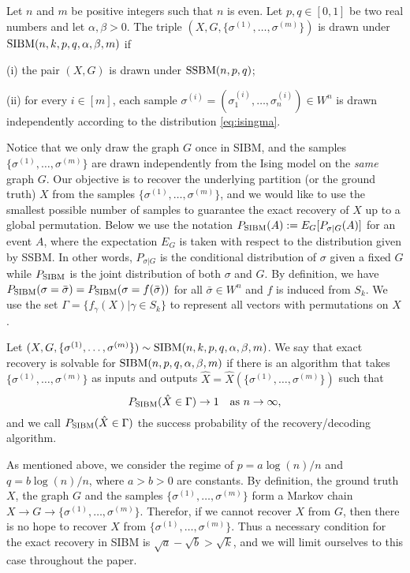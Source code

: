 \documentclass{article}
\begin{document}
\begin{definition}
Let $n$ and $m$ be positive integers such that $n$ is even. Let $p,q\in[0,1]$ be two real numbers and let $\alpha,\beta>0$. The triple $(X,G,\{\sigma^{(1)},\dots,\sigma^{(m)}\})$ is drawn under $\operatorname{SIBM}(n,k, p,q,\alpha,\beta,m)$ if

\noindent
(i) the pair $(X,G)$ is drawn under $\operatorname{SSBM}(n,p,q)$;

\noindent
(ii) for every $i\in[m]$, each sample $\sigma^{(i)}=(\sigma_1^{(i)},\dots,\sigma_n^{(i)}) \in W^n$ is drawn independently according to the distribution \eqref{eq:isingma}.
\end{definition}

Notice that we only draw the graph $G$ once in SIBM, and the samples $\{\sigma^{(1)},\dots,\sigma^{(m)}\}$ are drawn independently from the Ising model on the {\em same} graph $G$.
Our objective is to recover the underlying partition (or the ground truth) $X$ from the samples $\{\sigma^{(1)},\dots,\sigma^{(m)}\}$, and we would like to use the smallest possible number of samples to guarantee the exact recovery of $X$ up to a global permutation.
Below we use the notation $P_{\operatorname{SIBM}}(A):=E_G[P_{\sigma|G}(A)]$ for an event $A$, where the expectation $E_G$ is taken with respect to the distribution given by SSBM. In other words, $P_{\sigma|G}$ is the conditional distribution of  $\sigma$ given a fixed $G$ while $P_{\operatorname{SIBM}}$ is the joint distribution of both $\sigma$ and $G$.
By definition, we have $P_{\operatorname{SIBM}}(\sigma=\bar{\sigma})=P_{\operatorname{SIBM}}(\sigma=f(\bar{\sigma}))$ for all $\bar{\sigma}\in W^n$ and $f$ is induced from $S_k$. We use the set $\Gamma = \{f_{\gamma}(X) | \gamma \in S_k\}$ to
represent all vectors with permutations on $X$.

\begin{definition}
Let $(X,G,\{\sigma^{(1)},\dots,\sigma^{(m)}\}) \sim \operatorname{SIBM}(n,k, p,q,\alpha,\beta,m)$.
We say that exact recovery is solvable for $\operatorname{SIBM}(n,p,q,\alpha,\beta,m)$ if there is an algorithm that takes $\{\sigma^{(1)},\dots,\sigma^{(m)}\}$ as inputs and outputs $\hat{X}=\hat{X}(\{\sigma^{(1)},\dots,\sigma^{(m)}\})$ such that
$$
P_{\operatorname{SIBM}}(\hat{X} \in \Gamma) \to 1
\text{~~~as~} n\to\infty ,
$$
and we call $P_{\operatorname{SIBM}}(\hat{X} \in \Gamma)$ the success probability of the recovery/decoding algorithm.
\end{definition}


As mentioned above, we consider the regime of $p=a\log(n)/n$ and $q=b\log(n)/n$, where $a>b> 0$ are constants. By definition, the ground truth $X$, the graph $G$ and the samples $\{\sigma^{(1)},\dots,\sigma^{(m)}\}$ form a Markov chain $X\to G\to \{\sigma^{(1)},\dots,\sigma^{(m)}\}$. Therefor, if we cannot recover $X$ from $G$, then there is no hope to recover $X$ from $\{\sigma^{(1)},\dots,\sigma^{(m)}\}$. Thus a necessary condition for the exact recovery in SIBM is $\sqrt{a}-\sqrt{b}> \sqrt{k}$, and we will limit ourselves to this case throughout the paper.
\end{document}
